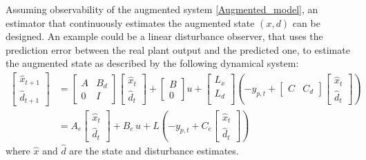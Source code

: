 \documentclass[a4paper,12pt,oneside]{book}
\begin{document}
\bigskip
Assuming observability of the augmented system \ref{Augmented_model}, an estimator that continuously estimates the augmented state $(x,d)$ can be designed.
An example could be a linear disturbance observer, that uses the prediction error between the real plant output and the predicted one, to estimate the augmented state as described by the following dynamical system:
\begin{equation}
    \begin{aligned}
    	\begin{bmatrix}
    	   \hat{x}_{t+1} \\
            \hat{d}_{t+1}
        \end{bmatrix}
        &= 
    	\begin{bmatrix}
    		A & B_d \\
    		0 & I
    	\end{bmatrix}
    	\begin{bmatrix}
    		\hat{x}_t \\
    		\hat{d}_t
    	\end{bmatrix}
        +
    	\begin{bmatrix}
    		B \\
    		0
    	\end{bmatrix}
        u +
        \begin{bmatrix}
            L_x \\
            L_d \\
        \end{bmatrix} 
        ( - y_{p,t} +
        \begin{bmatrix}
            C & C_d 
        \end{bmatrix}
        \begin{bmatrix}
            \hat{x}_t \\
            \hat{d}_t
        \end{bmatrix} ) \\
        & = A_e 
        \begin{bmatrix}
        \hat{x}_t \\
        \hat{d}_t
    	\end{bmatrix}
        + 
        B_e \, u +
        L (
         - y_{p,t} +
        C_e
        \begin{bmatrix}
            \hat{x}_t \\
            \hat{d}_t
        \end{bmatrix} )
    \end{aligned}
\label{eq:Estimator_and_observer}
\end{equation}
where $\hat{x}$ and $\hat{d}$ are the state and disturbance estimates.
\end{document}
